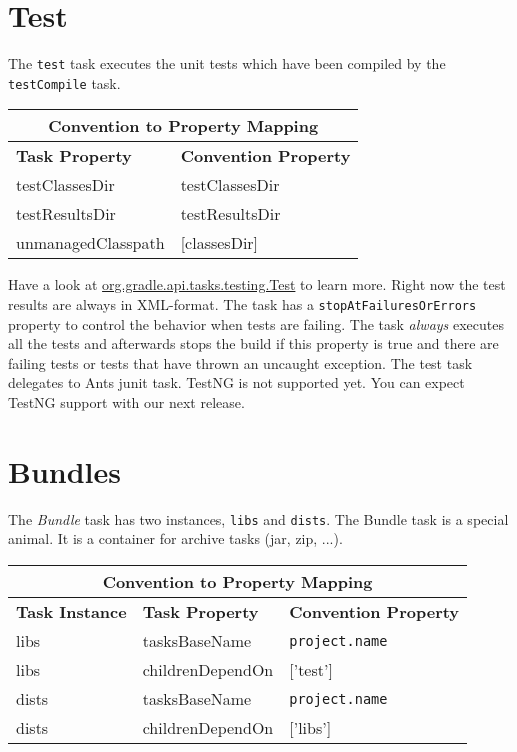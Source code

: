 \section{Test} %
\label{sec:test}
The \texttt{test} task executes the unit tests which have been compiled by the \texttt{testCompile} task. 
\begin{center}
	\begin{tabular}{|l|l|} \hline
		\multicolumn{2}{|c|}{Convention to Property Mapping} \\ \hline
	    \textbf{Task Property} & \textbf{Convention Property} \\ \hline
		testClassesDir & testClassesDir \\ \hline
		testResultsDir & testResultsDir \\ \hline
		unmanagedClasspath & [classesDir] \\ \hline
	\end{tabular} 
\end{center}
\noindent Have a look at \href{\API tasks/testing/Test.html}{org.gradle.api.tasks.testing.Test} to learn more. Right now the test results are always in XML-format. The task has a \texttt{stopAtFailuresOrErrors} property to control the behavior when tests are failing. The task \emph{always} executes all the tests and afterwards stops the build if this property is true and there are failing tests or tests that have thrown an uncaught exception. The test task delegates to Ants junit task. TestNG is not supported yet. You can expect TestNG support with our next release. 

\section{Bundles} %
\label{sec:bundles}
The \emph{Bundle} task has two instances, \texttt{libs} and \texttt{dists}. The Bundle task is a special animal. It is a container for archive tasks (jar, zip, ...).  
\begin{center}
	\begin{tabular}{|l|l|l|} \hline
		\multicolumn{3}{|c|}{Convention to Property Mapping} \\ \hline
		\textbf{Task Instance} & \textbf{Task Property} & \textbf{Convention Property} \\ \hline
		libs & tasksBaseName & \texttt{project.name} \\ \hline
		libs & childrenDependOn & ['test'] \\ \hline
		dists & tasksBaseName & \texttt{project.name} \\ \hline
		dists & childrenDependOn & ['libs'] \\ \hline
	\end{tabular} 
\end{center}
